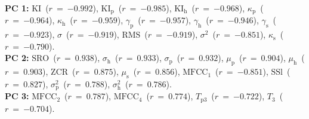 {\bf{PC 1:}} $\textrm{KI}$~($r~=~{-0.992}$), $\textrm{KI}_{\textrm{p}}$~($r~=~{-0.985}$), $\textrm{KI}_{\textrm{h}}$~($r~=~{-0.968}$), $\kappa_{\textrm{p}}$~($r~=~{-0.964}$), $\kappa_{\textrm{h}}$~($r~=~{-0.959}$), $\gamma_{\textrm{p}}$~($r~=~{-0.957}$), $\gamma_{\textrm{h}}$~($r~=~{-0.946}$), $\gamma_{\textrm{s}}$~($r~=~{-0.923}$), $\sigma$~($r~=~{-0.919}$), $\textrm{RMS}$~($r~=~{-0.919}$), $\sigma^{2}$~($r~=~{-0.851}$), $\kappa_{\textrm{s}}$~($r~=~{-0.790}$).\vspace{0.5em}\\
{\bf{PC 2:}} $\textrm{SRO}$~($r~=~{ 0.938}$), $\sigma_{\textrm{h}}$~($r~=~{ 0.933}$), $\sigma_{\textrm{p}}$~($r~=~{ 0.932}$), $\mu_{\textrm{p}}$~($r~=~{ 0.904}$), $\mu_{\textrm{h}}$~($r~=~{ 0.903}$), $\textrm{ZCR}$~($r~=~{ 0.875}$), $\mu_{\textrm{s}}$~($r~=~{ 0.856}$), $\textrm{MFCC}_{1}$~($r~=~{-0.851}$), $\textrm{SSl}$~($r~=~{ 0.827}$), $\sigma_{\textrm{p}}^{2}$~($r~=~{ 0.788}$), $\sigma_{\textrm{h}}^{2}$~($r~=~{ 0.786}$).\vspace{0.5em}\\
{\bf{PC 3:}} $\textrm{MFCC}_{2}$~($r~=~{ 0.787}$), $\textrm{MFCC}_{4}$~($r~=~{ 0.774}$), $T_{\textrm{p}3}$~($r~=~{-0.722}$), $T_{3}$~($r~=~{-0.704}$).
